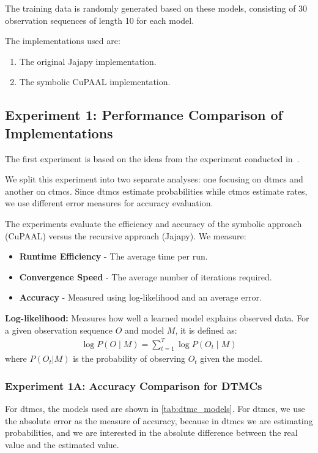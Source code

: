 The training data is randomly generated based on these models, consisting of 30 observation sequences of length 10 for each model.

The implementations used are:
\begin{enumerate}
    \item The original Jajapy implementation.
    \item The symbolic CuPAAL implementation.
\end{enumerate}

\subsection{Experiment 1: Performance Comparison of Implementations}
The first experiment is based on the ideas from the experiment conducted in~\cite{reynouard2024learning}.

We split this experiment into two separate analyses: one focusing on \glspl{dtmc} and another on \glspl{ctmc}. Since \glspl{dtmc} estimate probabilities while \glspl{ctmc} estimate rates, we use different error measures for accuracy evaluation.

The experiments evaluate the efficiency and accuracy of the symbolic approach (CuPAAL) versus the recursive approach (Jajapy). We measure:
\begin{itemize}
    \item \textbf{Runtime Efficiency} - The average time per run.
    \item \textbf{Convergence Speed} - The average number of iterations required.
    \item \textbf{Accuracy} - Measured using log-likelihood and an average error.
\end{itemize}

\textbf{Log-likelihood:} Measures how well a learned model explains observed data.
For a given observation sequence $O$ and model $M$, it is defined as:
\begin{equation}
    \begin{aligned}
        \log P(O \mid M) = \sum_{t=1}^{T} \log P(O_t \mid M)
    \end{aligned}
\end{equation}
where $P(O_t|M)$ is the probability of observing $O_t$ given the model.

\subsubsection{Experiment 1A: Accuracy Comparison for DTMCs}
For \glspl{dtmc}, the models used are shown in \autoref{tab:dtmc_models}.
For \glspl{dtmc}, we use the absolute error as the measure of accuracy, because in \glspl{dtmc} we are estimating probabilities, and we are interested in the absolute difference between the real value and the estimated value.

